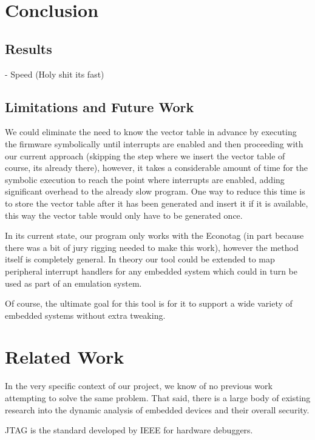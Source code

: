 \documentclass[letterpaper, 10 pt, conference]{ieeeconf}
\begin{document}
\section{Conclusion}
\subsection{Results}
- Speed (Holy shit its fast)

\subsection{Limitations and Future Work}%
We could eliminate the need to know the vector table in advance by executing the firmware symbolically until interrupts are enabled and then proceeding with our current approach (skipping the step where we insert the vector table of course, its already there), however, it takes a considerable amount of time for the symbolic execution to reach the point where interrupts are enabled, adding significant overhead to the already slow program. One way to reduce this time is to store the vector table after it has been generated and insert it if it is available, this way the vector table would only have to be generated once.

In its current state, our program only works with the Econotag (in part because there was a bit of jury rigging needed to make this work), however the method itself is completely general. In theory our tool could be extended to map peripheral interrupt handlers for any embedded system which could in turn be used as part of an emulation system.

Of course, the ultimate goal for this tool is for it to support a wide variety of embedded systems without extra tweaking. 

\section{Related Work} %
In the very specific context of our project, we know of no previous work attempting to solve the same problem. That said, there is a large body of existing research into the dynamic analysis of embedded devices and their overall security.

JTAG \cite{jtag} is the standard developed by IEEE for hardware debuggers.  
\end{document}
